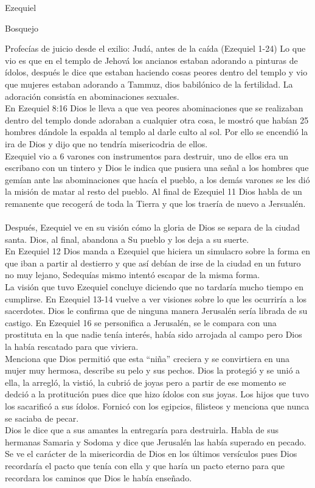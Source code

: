 \begin{section}{Ezequiel}
\begin{subsection}{Bosquejo}
\begin{subsubsection}{Profecías de juicio desde el exilio: Judá, antes de la caída (Ezequiel 1-24)}
Lo que vio es que en el templo de Jehová los ancianos estaban adorando a pinturas de ídolos, después le dice que estaban haciendo cosas peores dentro del templo y vio que mujeres estaban adorando a Tammuz, dios babilónico de la fertilidad. La adoración consistía en abominaciones sexuales.\\
En Ezequiel 8:16 Dios le lleva a que vea peores abominaciones que se realizaban dentro del templo donde adoraban a cualquier otra cosa, le mostró que habían 25 hombres dándole la espalda al templo al darle culto al sol. Por ello se encendió la ira de Dios y dijo que no tendría misericodria de ellos.\\
Ezequiel vio a 6 varones con instrumentos para destruir, uno de ellos era un escribano con un tintero y Dios le indica que pusiera una señal a los hombres que gemían ante las abominaciones que hacía el pueblo, a los demás varones se les dió la misión de matar al resto del pueblo. Al final de Ezequiel 11 Dios habla de un remanente que recogerá de toda la Tierra y que los traería de nuevo a Jersualén.\\
\\
Después, Ezequiel ve en su visión cómo la gloria de Dios se separa de la ciudad santa. Dios, al final, abandona a Su pueblo y los deja a su suerte.\\
En Ezequiel 12 Dios manda a Ezequiel que hiciera un simulacro sobre la forma en que iban a partir al destierro y que así debían de irse de la ciudad en un futuro no muy lejano, Sedequías mismo intentó escapar de la misma forma.\\
La visión que tuvo Ezequiel concluye diciendo que no tardaría mucho tiempo en cumplirse. En Ezequiel 13-14 vuelve a ver visiones sobre lo que les ocurriría a los sacerdotes. Dios le confirma que de ninguna manera Jerusalén sería librada de su castigo.
\newpage
En Ezequiel 16 se personifica a Jerusalén, se le compara con una prostituta en la que nadie tenía interés, había sido arrojada al campo pero Dios la había rescatado para que viviera.\\
Menciona que Dios permitió que esta ``niña'' creciera y se convirtiera en una mujer muy hermosa, describe su pelo y sus pechos. Dios la protegió y se unió a ella, la arregló, la vistió, la cubrió de joyas pero a partir de ese momento se dedció a la protitución pues dice que hizo ídolos con sus joyas. Los hijos que tuvo los sacarificó a sus ídolos. Fornicó con los egipcios, filisteos y menciona que nunca se saciaba de pecar.\\
Dios le dice que a sus amantes la entregaría para destruirla. Habla de sus hermanas Samaria y Sodoma y dice que Jerusalén las había superado en pecado. Se ve el carácter de la misericordia de Dios en los últimos versículos pues Dios recordaría el pacto que tenía con ella y que haría un pacto eterno para que recordara los caminos que Dios le había enseñado.\\

\end{subsubsection}
\end{subsection}
\end{section}
